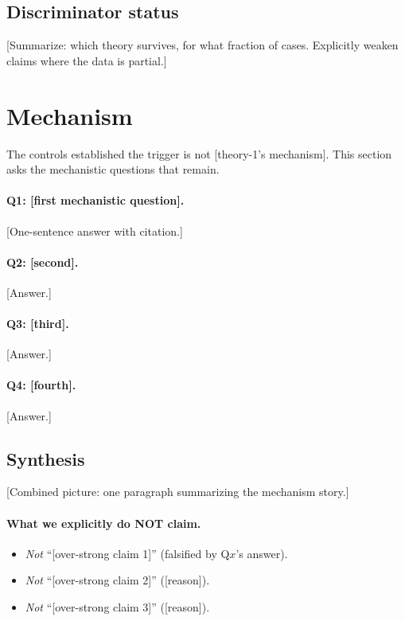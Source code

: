 \documentclass[11pt, letterpaper]{article}
\begin{document}
\subsection{Discriminator status}
[Summarize: which theory survives, for what fraction of cases. Explicitly
weaken claims where the data is partial.]

\section{Mechanism}
\label{sec:mechanism}

The controls established the trigger is not [theory-1's mechanism]. This
section asks the mechanistic questions that remain.

\paragraph{Q1: [first mechanistic question].}
[One-sentence answer with citation.]

\paragraph{Q2: [second].}
[Answer.]

\paragraph{Q3: [third].}
[Answer.]

\paragraph{Q4: [fourth].}
[Answer.]

\subsection{Synthesis}
\label{sec:synthesis}

[Combined picture: one paragraph summarizing the mechanism story.]

\paragraph{What we explicitly do NOT claim.}
\begin{itemize}[leftmargin=*, itemsep=1pt, topsep=2pt]
\item \emph{Not} ``[over-strong claim 1]'' (falsified by Q$x$'s answer).
\item \emph{Not} ``[over-strong claim 2]'' ([reason]).
\item \emph{Not} ``[over-strong claim 3]'' ([reason]).
\end{itemize}
\end{document}
